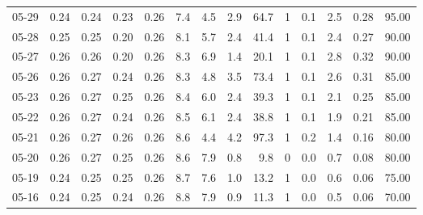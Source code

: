 \begin{threeparttable}
{\begin{tabular}{lrrrrrrrrrrrrr}
  05-29 &          0.24 &          0.24 &          0.23 &        0.26 &                 7.4 &                 4.5 &        2.9 &         64.7 &              1 &                 0.1 &              2.5 &            0.28 &                  95.00 \\
  05-28 &          0.25 &          0.25 &          0.20 &        0.26 &                 8.1 &                 5.7 &        2.4 &         41.4 &              1 &                 0.1 &              2.4 &            0.27 &                  90.00 \\
  05-27 &          0.26 &          0.26 &          0.20 &        0.26 &                 8.3 &                 6.9 &        1.4 &         20.1 &              1 &                 0.1 &              2.8 &            0.32 &                  90.00 \\
  05-26 &          0.26 &          0.27 &          0.24 &        0.26 &                 8.3 &                 4.8 &        3.5 &         73.4 &              1 &                 0.1 &              2.6 &            0.31 &                  85.00 \\
  05-23 &          0.26 &          0.27 &          0.25 &        0.26 &                 8.4 &                 6.0 &        2.4 &         39.3 &              1 &                 0.1 &              2.1 &            0.25 &                  85.00 \\
  05-22 &          0.26 &          0.27 &          0.24 &        0.26 &                 8.5 &                 6.1 &        2.4 &         38.8 &              1 &                 0.1 &              1.9 &            0.21 &                  85.00 \\
  05-21 &          0.26 &          0.27 &          0.26 &        0.26 &                 8.6 &                 4.4 &        4.2 &         97.3 &              1 &                 0.2 &              1.4 &            0.16 &                  80.00 \\
  05-20 &          0.26 &          0.27 &          0.25 &        0.26 &                 8.6 &                 7.9 &        0.8 &          9.8 &              0 &                 0.0 &              0.7 &            0.08 &                  80.00 \\
  05-19 &          0.24 &          0.25 &          0.25 &        0.26 &                 8.7 &                 7.6 &        1.0 &         13.2 &              1 &                 0.0 &              0.6 &            0.06 &                  75.00 \\
  05-16 &          0.24 &          0.25 &          0.24 &        0.26 &                 8.8 &                 7.9 &        0.9 &         11.3 &              1 &                 0.0 &              0.5 &            0.06 &                  70.00 \\

\end{tabular}}
\end{threeparttable}
